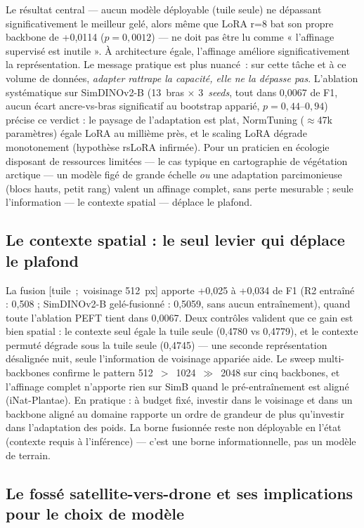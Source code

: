 \documentclass[11pt,a4paper]{article}
\begin{document}
Le résultat central — aucun modèle déployable (tuile seule) ne dépassant significativement le meilleur gelé, alors même que LoRA r=8 bat son propre backbone de +0,0114 ($p=0{,}0012$) — ne doit pas être lu comme « l'affinage supervisé est inutile ». À architecture égale, l'affinage améliore significativement la représentation. Le message pratique est plus nuancé~: sur cette tâche et à ce volume de données, \emph{adapter rattrape la capacité, elle ne la dépasse pas}. L'ablation systématique sur SimDINOv2-B (13~bras $\times$ 3~\emph{seeds}, tout dans 0,0067 de F1, aucun écart ancre-vs-bras significatif au bootstrap apparié, $p=0{,}44$--$0{,}94$) précise ce verdict : le paysage de l'adaptation est plat, NormTuning ($\approx$47k paramètres) égale LoRA au millième près, et le scaling LoRA dégrade monotonement (hypothèse rsLoRA infirmée). Pour un praticien en écologie disposant de ressources limitées — le cas typique en cartographie de végétation arctique — un modèle figé de grande échelle \emph{ou} une adaptation parcimonieuse (blocs hauts, petit rang) valent un affinage complet, sans perte mesurable ; seule l'information — le contexte spatial — déplace le plafond.

\subsection{Le contexte spatial : le seul levier qui déplace le plafond}

La fusion [tuile~;~voisinage 512~px] apporte +0,025 à +0,034 de F1 (R2 entraîné : 0,508 ; SimDINOv2-B gelé-fusionné : 0,5059, sans aucun entraînement), quand toute l'ablation PEFT tient dans 0,0067. Deux contrôles valident que ce gain est bien spatial : le contexte seul égale la tuile seule (0,4780 vs 0,4779), et le contexte permuté dégrade sous la tuile seule (0,4745) — une seconde représentation désalignée nuit, seule l'information de voisinage appariée aide. Le sweep multi-backbones confirme le pattern 512~$>$~1024~$\gg$~2048 sur cinq backbones, et l'affinage complet n'apporte rien sur SimB quand le pré-entraînement est aligné (iNat-Plantae). En pratique : à budget fixé, investir dans le voisinage et dans un backbone aligné au domaine rapporte un ordre de grandeur de plus qu'investir dans l'adaptation des poids. La borne fusionnée reste non déployable en l'état (contexte requis à l'inférence) — c'est une borne informationnelle, pas un modèle de terrain.

\subsection{Le fossé satellite-vers-drone et ses implications pour le choix de modèle}
\end{document}

